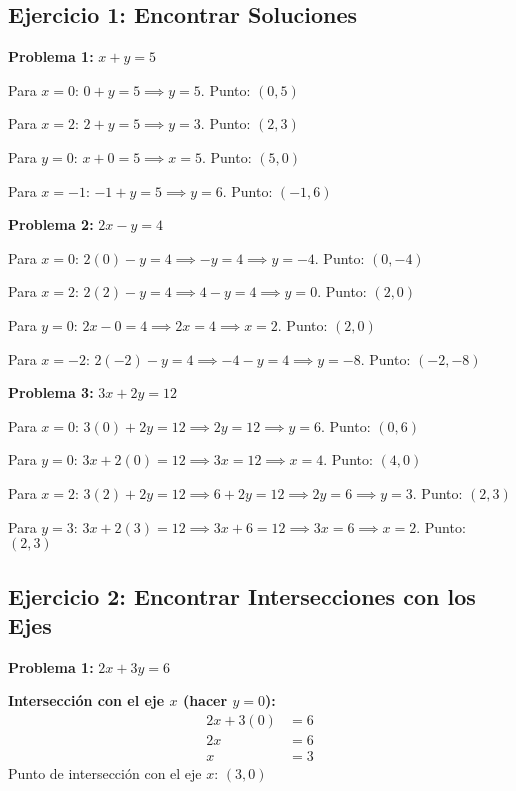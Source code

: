 
\subsection*{Ejercicio 1: Encontrar Soluciones}

\textbf{Problema 1:} $x + y = 5$

Para $x = 0$: $0 + y = 5 \implies y = 5$. Punto: $(0, 5)$

Para $x = 2$: $2 + y = 5 \implies y = 3$. Punto: $(2, 3)$

Para $y = 0$: $x + 0 = 5 \implies x = 5$. Punto: $(5, 0)$

Para $x = -1$: $-1 + y = 5 \implies y = 6$. Punto: $(-1, 6)$

\medskip

\textbf{Problema 2:} $2x - y = 4$

Para $x = 0$: $2(0) - y = 4 \implies -y = 4 \implies y = -4$. Punto: $(0, -4)$

Para $x = 2$: $2(2) - y = 4 \implies 4 - y = 4 \implies y = 0$. Punto: $(2, 0)$

Para $y = 0$: $2x - 0 = 4 \implies 2x = 4 \implies x = 2$. Punto: $(2, 0)$

Para $x = -2$: $2(-2) - y = 4 \implies -4 - y = 4 \implies y = -8$. Punto: $(-2, -8)$

\medskip

\textbf{Problema 3:} $3x + 2y = 12$

Para $x = 0$: $3(0) + 2y = 12 \implies 2y = 12 \implies y = 6$. Punto: $(0, 6)$

Para $y = 0$: $3x + 2(0) = 12 \implies 3x = 12 \implies x = 4$. Punto: $(4, 0)$

Para $x = 2$: $3(2) + 2y = 12 \implies 6 + 2y = 12 \implies 2y = 6 \implies y = 3$. Punto: $(2, 3)$

Para $y = 3$: $3x + 2(3) = 12 \implies 3x + 6 = 12 \implies 3x = 6 \implies x = 2$. Punto: $(2, 3)$

\newpage

\subsection*{Ejercicio 2: Encontrar Intersecciones con los Ejes}

\textbf{Problema 1:} $2x + 3y = 6$

\textbf{Intersección con el eje $x$ (hacer $y = 0$):}
\begin{align*}
2x + 3(0) &= 6 \\
2x &= 6 \\
x &= 3
\end{align*}
Punto de intersección con el eje $x$: $(3, 0)$

